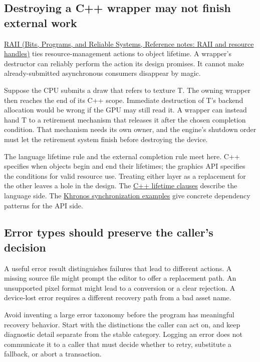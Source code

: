 \subsection{Destroying a C++ wrapper may not finish external work}\label{05-engine-i-ch008-destroying-a-c-wrapper-may-not-finish-external-work}

\href{../01-Bits-Programs-and-Reliable-Systems/main.pdf\#nameddest=appendix-69739d3ab49b}{RAII (Bits, Programs, and Reliable Systems, Reference notes: RAII and resource handles)} ties resource-management actions to object lifetime. A wrapper's destructor can reliably perform the action its design promises. It cannot make already-submitted asynchronous consumers disappear by magic.

Suppose the CPU submits a draw that refers to texture T. The owning wrapper then reaches the end of its C++ scope. Immediate destruction of T's backend allocation would be wrong if the GPU may still read it. A wrapper can instead hand T to a retirement mechanism that releases it after the chosen completion condition. That mechanism needs its own owner, and the engine's shutdown order must let the retirement system finish before destroying the device.

The language lifetime rule and the external completion rule meet here. C++ specifies when objects begin and end their lifetimes; the graphics API specifies the conditions for valid resource use. Treating either layer as a replacement for the other leaves a hole in the design. The \href{https://eel.is/c++draft/basic.life}{C++ lifetime clauses} describe the language side. The \href{https://docs.vulkan.org/guide/latest/synchronization_examples.html}{Khronos synchronization examples} give concrete dependency patterns for the API side.

\subsection{Error types should preserve the caller's decision}\label{05-engine-i-ch008-error-types-should-preserve-the-callers-decision}

A useful error result distinguishes failures that lead to different actions. A missing source file might prompt the editor to offer a replacement path. An unsupported pixel format might lead to a conversion or a clear rejection. A device-lost error requires a different recovery path from a bad asset name.

Avoid inventing a large error taxonomy before the program has meaningful recovery behavior. Start with the distinctions the caller can act on, and keep diagnostic detail separate from the stable category. Logging an error does not communicate it to a caller that must decide whether to retry, substitute a fallback, or abort a transaction.

